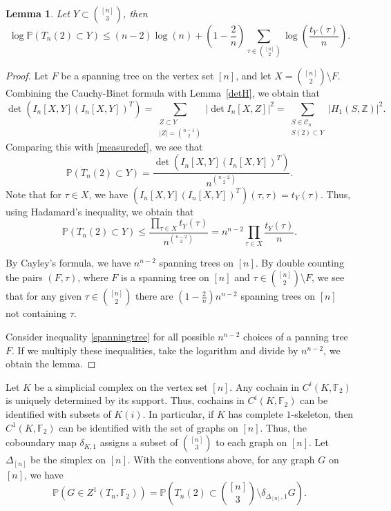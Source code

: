 \documentclass[11pt,a4paper]{article}
\theoremstyle{plain}
\newtheorem{lemma}[theorem]{Lemma}
\theoremstyle{definition}
\begin{document}
\begin{lemma}\label{upperb}
Let $Y\subset {{[n]}\choose {3}}$, then
\[\log \mathbb{P}(T_n(2)\subset Y)\le (n-2)\log (n)+\left(1-\frac{2}n\right)\sum_{\tau\in {{[n]}\choose{2}}} \log\left(\frac{t_Y(\tau)}{n}\right).\]

\end{lemma}
\begin{proof}
Let $F$ be a spanning tree on the vertex set $[n]$, and let $X={{[n]}\choose {2}}\setminus F$. Combining the Cauchy-Binet formula with Lemma~\ref{detH}, we obtain that
\[\det(I_n[X,Y](I_n[X,Y])^T)=\sum_{\substack{Z\subset Y\\|Z|={{n-1}\choose 2}}} |\det I_n[X,Z]|^2=\sum_{\substack{S\in\mathcal{C}_n\\S(2)\subset Y}} |H_1(S,\mathbb{Z})|^2.\]
Comparing this with \eqref{measuredef}, we see that
\[\mathbb{P}(T_n(2)\subset Y)=\frac{\det(I_n[X,Y](I_n[X,Y])^T)}{n^{{n-2}\choose{2}}}.\]
Note that for $\tau\in X$, we have $(I_n[X,Y](I_n[X,Y])^T)(\tau,\tau)=t_Y(\tau)$. Thus, using Hadamard's inequality, we obtain that
\begin{equation}\label{spanningtree}\mathbb{P}(T_n(2)\subset Y)\le\frac{\prod_{\tau\in X} t_Y(\tau)}{n^{{n-2}\choose{2}}}=n^{n-2}\prod_{\tau\in X}\frac{t_Y(\tau)}{n}.\end{equation}

By Cayley's formula, we have $n^{n-2}$ spanning trees on $[n]$. By double counting the pairs $(F,\tau)$, where $F$ is a spanning tree on $[n]$ and $\tau\in {{[n]}\choose {2}}\setminus F$, we see that for any given $\tau\in {{[n]}\choose{2}}$ there are $\left(1-\frac{2}n\right)n^{n-2}$  spanning trees on $[n]$ not containing $\tau$. 

Consider inequality \eqref{spanningtree} for all possible $n^{n-2}$ choices of a panning tree $F$. If we multiply these inequalities, take the logarithm and divide by $n^{n-2}$, we obtain the lemma.  
\end{proof}


Let $K$ be a simplicial complex on the vertex set $[n]$. Any cochain in $C^i(K,\mathbb{F}_2)$ is uniquely determined by its support. Thus, cochains in $C^i(K,\mathbb{F}_2)$ can be identified with subsets of $K(i)$. In particular, if $K$ has complete $1$-skeleton, then  $C^1(K,\mathbb{F}_2)$ can be identified with the set of graphs on $[n]$. Thus, the coboundary map $\delta_{K,1}$ assigns a subset of ${{[n]}\choose 3}$ to each graph on $[n]$. Let $\Delta_{[n]}$ be the simplex on $[n]$. With the conventions above, for any graph $G$ on $[n]$, we have
\begin{equation}\label{cohgraph}
    \mathbb{P}\left(G\in Z^1(T_n,\mathbb{F}_2)\right)=\mathbb{P}\left(T_n(2)\subset {{[n]}\choose 3} \setminus   \delta_{\Delta_{[n]},1} G\right).
\end{equation}
\end{document}
